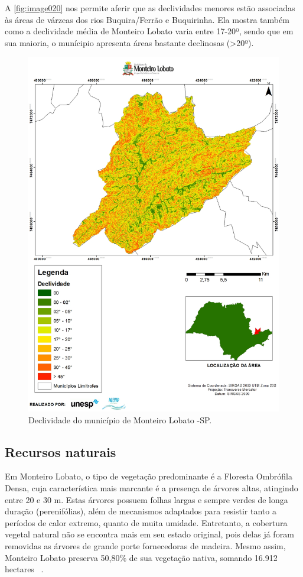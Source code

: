 A \autoref{fig:image020} nos permite aferir que as declividades menores estão   associadas às áreas de várzeas dos rios Buquira/Ferrão e Buquirinha. Ela mostra também como a declividade média de Monteiro Lobato varia entre 17-20º, sendo que em sua maioria, o munícipio apresenta áreas bastante declinosas (>20º).
\newpage
\begin{figure}[h!]
	\centering
	\includegraphics[width=1\linewidth]{produtos/proddois/image020}
	\caption{Declividade do município de Monteiro Lobato -SP.}
	\label{fig:image020}
\end{figure}
\clearpage
\subsection{Recursos naturais}

Em Monteiro Lobato, o tipo de vegetação predominante é a Floresta Ombrófila Densa, cuja característica mais marcante é a presença de árvores altas, atingindo entre 20 e 30 m.  Estas árvores possuem folhas largas e sempre verdes de longa duração (perenifólias), além de mecanismos adaptados para resistir tanto a períodos de calor extremo, quanto de muita umidade. Entretanto, a cobertura vegetal natural não se encontra mais em seu estado original, pois delas já foram removidas as árvores de grande porte fornecedoras de madeira. Mesmo assim, Monteiro Lobato preserva 50,80\% de sua vegetação nativa, somando 16.912 hectares ~\cite{MonteiroLobato2014}.

